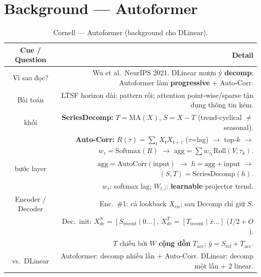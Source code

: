 \documentclass[12pt,a4paper]{article}
\newcommand{\cornellhead}{%
  \toprule
  \textbf{Cue / Question} & \textbf{Detail} \\
  \midrule
}
\begin{document}
\section{Background --- Autoformer}

\begin{table}[H]
  \centering
  \caption{Cornell --- Autoformer (background cho DLinear).}
  \label{tab:cornell-autoformer}
  \small
  \begin{tabularx}{\textwidth}{@{}CD@{}}
    \cornellhead
    Vì sao đọc?       &
    Wu et al.\ NeurIPS 2021.
    DLinear mượn ý \textbf{decomp}; Autoformer làm \textbf{progressive} + Auto-Corr.              \\
    \addlinespace
    Bài toán          &
    LTSF horizon dài; pattern rối; attention point-wise/sparse tận dụng thông tin kém.            \\
     khối            &
    \textbf{SeriesDecomp:} \(T=\mathrm{MA}(X)\), \(S=X-T\)
    (trend-cyclical $\neq$ seasonal).                                                             \\
                      & \textbf{Auto-Corr:} \(R(\tau)=\sum_t X_t X_{t+\tau}\)
    (\(\tau\)=lag) $\to$ top-\(k\) $\to$
    \(w_\tau=\mathrm{Softmax}(R)\) $\to$
    \(\mathrm{agg}=\sum w_{\tau_k}\mathrm{Roll}(V,\tau_k)\).                                      \\
     bước layer      &
    \(\mathrm{agg}=\mathrm{AutoCorr}(\mathrm{input})\)
    $\to$ \(h=\mathrm{agg}+\mathrm{input}\)
    $\to$ \((S,T)=\mathrm{SeriesDecomp}(h)\).                                                     \\
                      & \(w_\tau\): softmax lag; \(W_{l,i}\): \textbf{learnable} projector trend. \\
    \addlinespace
    Encoder / Decoder &
    Enc.\ \#1: cả lookback \(X_{en}\); sau Decomp chỉ giữ \(S\).                                  \\
                      & Dec.\ init: \(X_{de}^{S}=[S_{\mathrm{recent}}\mid 0{\ldots}]\),
    \(X_{de}^{T}=[T_{\mathrm{recent}}\mid \bar{x}{\ldots}]\) (\(I/2+O\)).                         \\
                      & \(T\) chiếu bởi \(W\) \textbf{cộng dồn} \(T_{\mathrm{acc}}\);
    \(\hat{y}=S_{\mathrm{ref}}+T_{\mathrm{acc}}\).                                                \\
    \addlinespace
    vs.\ DLinear      &
    Autoformer: decomp nhiều lần + Auto-Corr.
    DLinear: decomp một lần + 2 linear.                                                           \\
    \bottomrule
  \end{tabularx}
\end{table}
\end{document}
